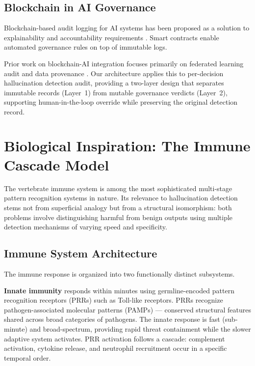 \documentclass[11pt,a4paper]{article}
\begin{document}
\subsection{Blockchain in AI Governance}

Blockchain-based audit logging for AI systems has been proposed as a solution
to explainability and accountability requirements \citep{dinh2018blockbench,
salah2019blockchain,mamoshina2018converging}. Smart contracts enable automated
governance rules on top of immutable logs.

Prior work on blockchain-AI integration focuses primarily on federated learning
audit \citep{warnat2021swarm} and data provenance \citep{ahmed2020survey}. Our
architecture applies this to per-decision hallucination detection audit,
providing a two-layer design that separates immutable records (Layer~1) from
mutable governance verdicts (Layer~2), supporting human-in-the-loop override
while preserving the original detection record.

\section{Biological Inspiration: The Immune Cascade Model}
\label{sec:bio}

The vertebrate immune system is among the most sophisticated multi-stage pattern
recognition systems in nature. Its relevance to hallucination detection stems
not from superficial analogy but from a structural isomorphism: both problems
involve distinguishing harmful from benign outputs using multiple detection
mechanisms of varying speed and specificity.

\subsection{Immune System Architecture}

The immune response is organized into two functionally distinct subsystems.

\textbf{Innate immunity} responds within minutes using germline-encoded pattern
recognition receptors (PRRs) such as Toll-like receptors. PRRs recognize
pathogen-associated molecular patterns (PAMPs) --- conserved structural features
shared across broad categories of pathogens. The innate response is fast
(sub-minute) and broad-spectrum, providing rapid threat containment while the
slower adaptive system activates. PRR activation follows a cascade: complement
activation, cytokine release, and neutrophil recruitment occur in a specific
temporal order.
\end{document}
